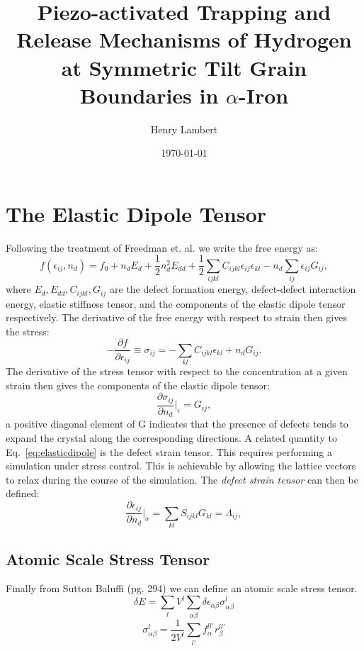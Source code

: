 \documentclass{article}
\begin{document}
\title{Piezo-activated Trapping and Release Mechanisms of Hydrogen at Symmetric Tilt Grain Boundaries in $\alpha$-Iron}
\author{Henry Lambert}
\date{\today}
\maketitle

\section{The Elastic Dipole Tensor}
\label{sec:segregation}
Following the treatment of Freedman et. al.\cite{freedman09} we write the free energy as:
%
\begin{equation}
\label{eq:freeenergy}
f(\epsilon_{ij}, n_{d}) = f_{0} + n_{d}E_{d} + \frac{1}{2}n^{2}_{d}E_{dd} +
\frac{1}{2}\sum_{ijkl}C_{ijkl}\epsilon_{ij}\epsilon_{kl}−n_{d}\sum_{ij}\epsilon_{ij}G_{ij},
\end{equation}
%
where $E_{d}, E_{dd}, C_{ijkl}, G_{ij}$ are the defect formation energy, 
defect-defect interaction energy, elastic stiffness tensor, and the components of the elastic 
dipole tensor respectively. The derivative of the free energy 
with respect to strain then gives the stress:
%
\begin{equation}
-\frac{\partial f}{\partial \epsilon_{ij}} \equiv \sigma_{ij} = - \sum_{kl}C_{ijkl}\epsilon_{kl} + n_{d}G_{ij}.
\end{equation}
%
The derivative of the stress tensor with respect to the 
concentration at a given strain then gives the components of the
elastic dipole tensor:
%
\begin{equation}
\label{eq:elasticdipole}
\frac{\partial \sigma_{ij}}{\partial n_{d}}\Bigr|_{\epsilon} = G_{ij},
\end{equation}
%
a positive diagonal element of G indicates that the presence of
defects tends to expand the crystal along the corresponding directions.
%
A related quantity to Eq.~\ref{eq:elasticdipole} is the defect strain tensor.
This requires performing a simulation under stress control. This is achievable
by allowing the lattice vectors to relax during the course of the simulation.
The \emph{defect strain tensor} can then be defined:
%
\begin{equation}
\frac{\partial \epsilon_{ij}}{\partial n_{d}}\Bigr|_{\sigma} = \sum_{kl}S_{ijkl}G_{kl} = \Lambda_{ij},
\end{equation}
%

\subsection{Atomic Scale Stress Tensor}
Finally from Sutton Baluffi (pg. 294) we can define an atomic
scale stress tensor.
%
\begin{equation}
\delta E = \sum_{l}V^{l}\sum_{\alpha\beta}\delta\epsilon_{\alpha\beta}\sigma^{l}_{\alpha\beta}
\end{equation}
%
\begin{equation}
\sigma^{l}_{\alpha\beta} = \frac{1}{2V^{l}} \sum_{l'}f^{ll'}_{\alpha}r_{\beta}^{ll'}
\end{equation}
\end{document}
